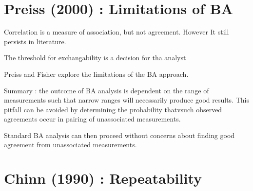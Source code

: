 %

\section*{Preiss (2000) : Limitations of BA }

Correlation is a measure of association, but not agreement. However It still persists in literature.

The threshold for exchangability is a decision for tha analyst

Preiss and Fisher explore the limitations of the BA approach.

Summary : the outcome of BA analysis is dependent on the range of measurements such that narrow ranges will necessarily produce good results.
This pitfall can be avoided by determining the probability thatvsuch observed agreements occur in pairing of unassociated measurements.

Standard BA analysis can then proceed without concerns about finding good agreement from unassociated measurements.



\section*{Chinn (1990) : Repeatability}
